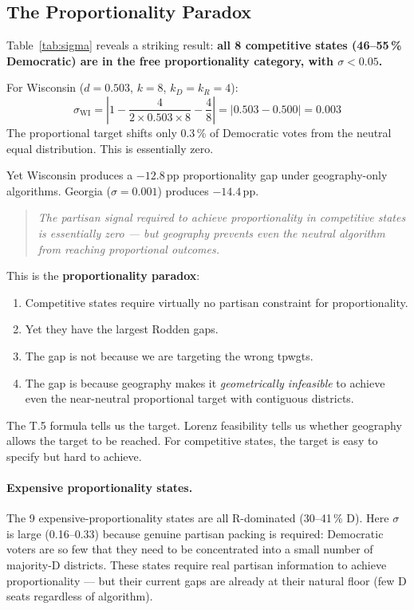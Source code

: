\subsection{The Proportionality Paradox}
\label{sec:paradox}

Table~\ref{tab:sigma} reveals a striking result:
\textbf{all 8 competitive states (46--55\,\% Democratic) are in the free
proportionality category, with $\sigma < 0.05$.}

For Wisconsin ($d = 0.503$, $k=8$, $k_D = k_R = 4$):
\[
  \sigma_{\text{WI}} = \left|1 - \frac{4}{2 \times 0.503 \times 8} - \frac{4}{8}\right|
  = |0.503 - 0.500| = 0.003
\]
The proportional target shifts only 0.3\,\% of Democratic votes from the neutral
equal distribution. This is essentially zero.

Yet Wisconsin produces a $-12.8$\,pp proportionality gap under geography-only
algorithms. Georgia ($\sigma = 0.001$) produces $-14.4$\,pp.

\begin{quote}
\emph{The partisan signal required to achieve proportionality in competitive states is essentially zero --- but geography prevents even the neutral algorithm from reaching proportional outcomes.}
\end{quote}

This is the \textbf{proportionality paradox}:
\begin{enumerate}
\item Competitive states require virtually no partisan constraint for proportionality.
\item Yet they have the largest Rodden gaps.
\item The gap is not because we are targeting the wrong tpwgts.
\item The gap is because geography makes it \emph{geometrically infeasible} to achieve
  even the near-neutral proportional target with contiguous districts.
\end{enumerate}

The T.5 formula tells us the target.
Lorenz feasibility tells us whether geography allows the target to be reached.
For competitive states, the target is easy to specify but hard to achieve.

\paragraph{Expensive proportionality states.}
The 9 expensive-proportionality states are all R-dominated (30--41\,\% D).
Here $\sigma$ is large (0.16--0.33) because genuine partisan packing is
required: Democratic voters are so few that they need to be concentrated
into a small number of majority-D districts.
These states require real partisan information to achieve proportionality ---
but their current gaps are already at their natural floor (few D seats
regardless of algorithm).

